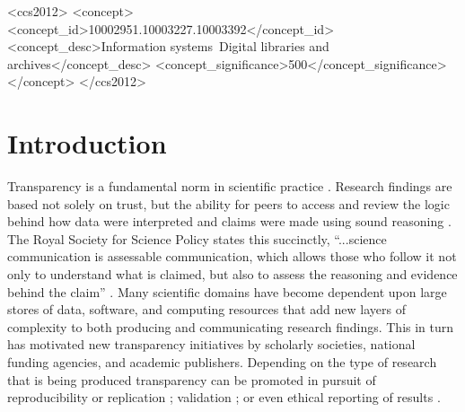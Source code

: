 \documentclass[sigchi]{acmart}
\begin{document}
%
%
\begin{CCSXML}
<ccs2012>
<concept>
<concept_id>10002951.10003227.10003392</concept_id>
<concept_desc>Information systems~Digital libraries and archives</concept_desc>
<concept_significance>500</concept_significance>
</concept>
</ccs2012>
\end{CCSXML}
%


\maketitle

\section{Introduction}
Transparency is a fundamental norm in scientific practice \cite{merton1942science}.  Research findings are based not solely on trust, but the ability for peers to access and review the logic behind how data were interpreted and claims were made using sound reasoning \cite{pedersen_empiricism_2008}. The Royal Society for Science Policy states this succinctly, “...science communication is assessable communication, which allows those who follow it not only to understand what is claimed, but also to assess the reasoning and evidence behind the claim” \cite{royal_society_great_britain_science_2012}. Many scientific domains have become dependent upon large stores of data, software, and computing resources that add new layers of complexity to both producing and communicating research findings. This in turn has motivated new transparency initiatives by scholarly societies, national funding agencies, and academic publishers. Depending on the type of research that is being produced transparency can be promoted in pursuit of reproducibility or replication \cite{open2012open}; validation \cite{fischer2019politics}; or even ethical reporting of results \cite{nicholls2016reporting}. 
\end{document}
